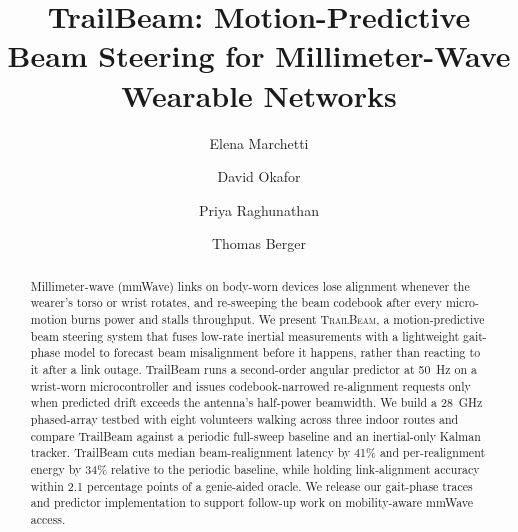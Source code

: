 \documentclass[sigconf,10pt,anonymous]{acmart}
\begin{document}
\title{TrailBeam: Motion-Predictive Beam Steering for Millimeter-Wave Wearable Networks}

\author{Elena Marchetti}

\author{David Okafor}

\author{Priya Raghunathan}

\author{Thomas Berger}

\renewcommand{\shortauthors}{Marchetti et al.}

\begin{abstract}
Millimeter-wave (mmWave) links on body-worn devices lose alignment whenever the wearer's
torso or wrist rotates, and re-sweeping the beam codebook after every micro-motion burns
power and stalls throughput. We present \textsc{TrailBeam}, a motion-predictive beam
steering system that fuses low-rate inertial measurements with a lightweight gait-phase model
to forecast beam misalignment before it happens, rather than reacting to it after a link
outage. TrailBeam runs a second-order angular predictor at 50~Hz on a wrist-worn
microcontroller and issues codebook-narrowed re-alignment requests only when predicted drift
exceeds the antenna's half-power beamwidth. We build a 28~GHz phased-array testbed with eight
volunteers walking across three indoor routes and compare TrailBeam against a periodic
full-sweep baseline and an inertial-only Kalman tracker. TrailBeam cuts median
beam-realignment latency by 41\% and per-realignment energy by 34\% relative to the periodic
baseline, while holding link-alignment accuracy within 2.1 percentage points of a
genie-aided oracle. We release our gait-phase traces and predictor implementation to support
follow-up work on mobility-aware mmWave access.
\end{abstract}

\end{document}
